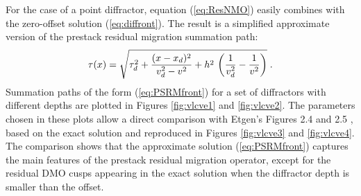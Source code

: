 For the case of a point diffractor, equation (\ref{eq:ResNMO}) easily
combines with the zero-offset solution (\ref{eq:diffront}). The result
is a simplified approximate version of the prestack residual migration
summation path:
\begin{equation}
\tau(x)=\sqrt{\tau_d^2 + 
{{(x - x_d)^2} \over {v_d^2 - v^2}} +
h^2\,\left({1 \over v_d^2} - {1 \over v^2}\right)}\;.
\label{eq:PSRMfront}
\end{equation}
Summation paths of the form (\ref{eq:PSRMfront}) for a set of diffractors
with different depths are plotted in Figures \ref{fig:vlcve1} and
\ref{fig:vlcve2}. The parameters chosen in these plots allow a direct
comparison with Etgen's Figures 2.4 and 2.5 \cite[]{Etgen.sepphd.68},
based on the exact solution and reproduced in Figures \ref{fig:vlcve3} and
\ref{fig:vlcve4}. The comparison shows that the approximate
solution (\ref{eq:PSRMfront}) captures the main features of the prestack
residual migration operator, except for the residual DMO cusps
appearing in the exact solution when the diffractor depth is smaller
than the offset.



